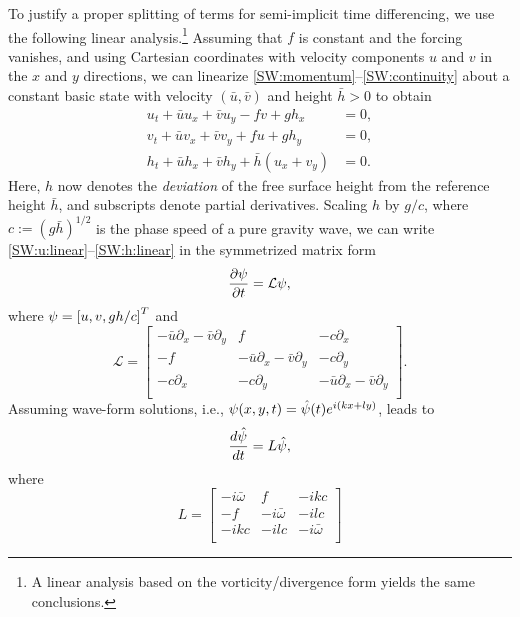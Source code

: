\documentclass[12pt]{article}
\newcommand{\ubar}{\bar{u}}
\newcommand{\vbar}{\bar{v}}
\newcommand{\href}{\bar{h}}
\newcommand{\omegabar}{\bar{\omega}}
\newcommand{\opL}{\mathcal{L}}
\begin{document}
To justify a proper splitting of terms for semi-implicit time differencing, we
use the following linear analysis.\footnote{A linear analysis based on the
vorticity/divergence form yields the same conclusions.}   Assuming that $f$ is
constant and the forcing vanishes, and using Cartesian coordinates with
velocity components $u$ and $v$ in the $x$ and $y$ directions, we can
linearize \eqref{SW:momentum}--\eqref{SW:continuity} about a constant basic
state with velocity $(\ubar,\vbar)$ and height $\href>0$ to obtain
\begin{align}
  u_t + \ubar u_x + \vbar u_y - fv + gh_x &= 0 , 
\label{SW:u:linear}\\
  v_t + \ubar v_x + \vbar v_y + fu + gh_y &= 0 , 
\label{SW:v:linear}\\
  h_t + \ubar h_x + \vbar h_y + \href(u_x + v_y) &= 0 .
\label{SW:h:linear}
\end{align}
Here, $h$ now denotes the \emph{deviation} of the free surface height from the
reference height $\href$, and subscripts denote partial derivatives.  Scaling
$h$ by $g/c$, where $c:=\left(g\href\right)^{1/2}$ is the phase speed of a
pure gravity wave, we can write \eqref{SW:u:linear}--\eqref{SW:h:linear} in the
symmetrized matrix form
\begin{equation}
  \dfrac{\partial\solvec}{\partial t} = \opL\solvec ,
\end{equation}
where $\psi = \left[ u, v, gh/c \right]^T$ and
\begin{equation}
  \opL = \begin{bmatrix}
       -\ubar\partial_x - \vbar\partial_y & f & -c\partial_x \\
      -f & -\ubar\partial_x - \vbar\partial_y & -c\partial_y \\
      -c\partial_x & -c\partial_y & -\ubar\partial_x - \vbar\partial_y \\
      \end{bmatrix} .
\end{equation}
Assuming wave-form solutions, i.e., $\psi(x,y,t) = \hat{\psi}(t) e^{i(kx+ly)}$, 
leads to
\begin{equation}
  \dfrac{d\hat{\psi}}{dt} = L\hat{\psi},
\label{SW:matrix}
\end{equation}
where
\begin{equation}
  L = \begin{bmatrix}
       -i\omegabar & f & -ikc \\
      -f & -i\omegabar & -ilc \\
      -ikc & -ilc & -i\omegabar \\
      \end{bmatrix}
\end{equation}
\end{document}
